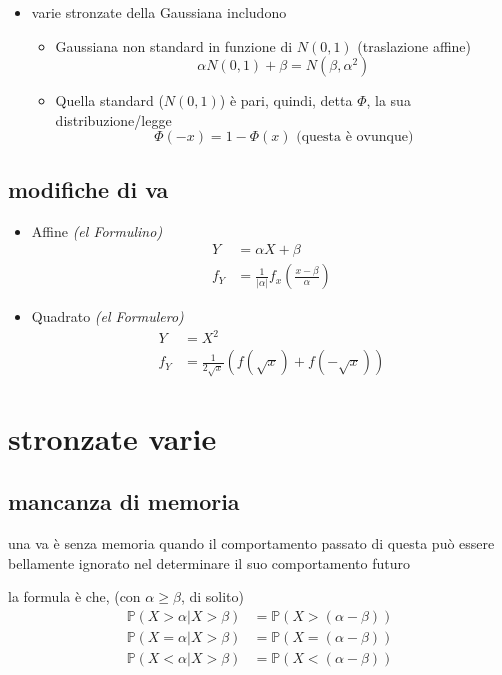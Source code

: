 \documentclass{article}
\begin{document}
\begin{itemize}
\item varie stronzate della Gaussiana includono
  \begin{itemize}
  \item Gaussiana non standard in funzione di $N(0,1)$ (traslazione affine)
    \[
    \alpha N(0,1) + \beta = N(\beta, \alpha^2)
    \]
  \item Quella standard ($N(0,1)$) è pari, quindi, detta $\Phi$, la sua distribuzione/legge
    \[
    \Phi(-x) = 1-\Phi(x) \text{ (questa è ovunque)}
    \]
  \end{itemize}
\end{itemize}

\subsection{modifiche di va}
\begin{itemize}
\item Affine \textit{(el Formulino)} \\
  \begin{align*}
    Y &= \alpha X + \beta \\
    f_Y &= \frac{1}{\lvert \alpha \rvert} f_x (\frac{x - \beta}{\alpha})
  \end{align*}
\item Quadrato \textit{(el Formulero)} \\
  \begin{align*}
    Y &= X^2 \\
    f_Y &= \frac{1}{2\sqrt{x}} (f(\sqrt{x}) + f(-\sqrt{x}))
  \end{align*}
\end{itemize}

\section{stronzate varie}
\subsection{
  mancanza di memoria}
una va è senza memoria quando il comportamento passato di questa può essere bellamente ignorato nel determinare il suo comportamento futuro

la formula è che, (con $\alpha \geq \beta$, di solito)
\begin{align*}
  \mathbb{P}(X > \alpha | X > \beta) &= \mathbb{P}(X > (\alpha - \beta)) \\
  \mathbb{P}(X = \alpha | X > \beta) &= \mathbb{P}(X = (\alpha - \beta)) \\
  \mathbb{P}(X < \alpha | X > \beta) &= \mathbb{P}(X < (\alpha - \beta))
\end{align*}
\end{document}
